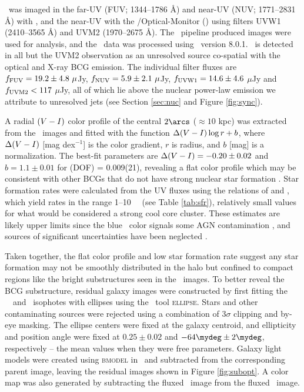 \documentclass[11pt, preprint]{aastex}
\begin{document}
\rbs\ was imaged in the far-UV (FUV; 1344--1786 \AA) and near-UV (NUV;
1771--2831 \AA) with \galex, and the near-UV with the
\xmm/Optical-Monitor (\xom) using filters UVW1 (2410--3565 \AA) and
UVM2 (1970--2675 \AA). The \galex\ pipeline produced images were used
for analysis, and the \xom\ data was processed using \sas\ version
8.0.1. \rbs\ is detected in all but the UVM2 observation as an
unresolved source co-spatial with the optical and X-ray BCG
emission. The individual filter fluxes are $f_{\rm{FUV}} = 19.2 \pm
4.8 ~\mu$Jy, $f_{\rm{NUV}} = 5.9 \pm 2.1 ~\mu$Jy, $f_{\rm{UVW1}} =
14.6 \pm 4.6$ $\mu$Jy and $f_{\rm{UVM2}} < 117$ $\mu$Jy, all of which
lie above the nuclear power-law emission we attribute to unresolved
jets (see Section \ref{sec:nuc} and Figure \ref{fig:sync}).

A radial $(V-I)$ color profile of the central $2\arcs$ ($\approx
10$ kpc) was extracted from the \hst\ images and fitted with the
function $\Delta(V-I) \log r + b$, where $\Delta(V-I)$
[mag dex$^{-1}$] is the color gradient, $r$ is radius, and $b$ [mag]
is a normalization. The best-fit parameters are $\Delta(V-I) =
-0.20 \pm 0.02$ and $b = 1.1 \pm 0.01$ for \chisq(DOF) = 0.009(21),
revealing a flat color profile which may be consistent with other BCGs
that do not have strong nuclear star formation
\citep[\eg][]{rafferty06}. Star formation rates were calculated from
the UV fluxes using the relations of \citet{kennicutt2} and
\citet{salim2007}, which yield rates in the range 1--10 ~\msolpy\ (see
Table \ref{tab:sfr}), relatively small values for what would be
considered a strong cool core cluster. These estimates are likely
upper limits since the blue \galex\ color signals some AGN
contamination \citep{2005AJ....130.1022A}, and sources of significant
uncertainties have been neglected \citep[\eg][]{1992ApJ...388..310K,
  2004AJ....127.2002K, hicksuv, 2010MNRAS.tmp..626G}.

Taken together, the flat color profile and low star formation rate
suggest any star formation may not be smoothly distributed in the halo
but confined to compact regions like the bright substructures seen in
the \hst\ images. To better reveal the BCG substructure, residual
galaxy images were constructed by first fitting the \hst\ \myv\ and
\myi\ isophotes with ellipses using the \iraf\ tool
                {\textsc{ellipse}}. Stars and other contaminating
                sources were rejected using a combination of $3\sigma$
                clipping and by-eye masking. The ellipse centers were
                fixed at the galaxy centroid, and ellipticity and
                position angle were fixed at $0.25 \pm 0.02$ and
                $-64\mydeg \pm 2\mydeg$, respectively -- the mean
                values when they were free parameters. Galaxy light
                models were created using {\textsc{bmodel}} in
                \iraf\ and subtracted from the corresponding parent
                image, leaving the residual images shown in Figure
                \ref{fig:subopt}. A color map was also generated by
                subtracting the fluxed \myi\ image from the fluxed
                \myv\ image.
\end{document}
